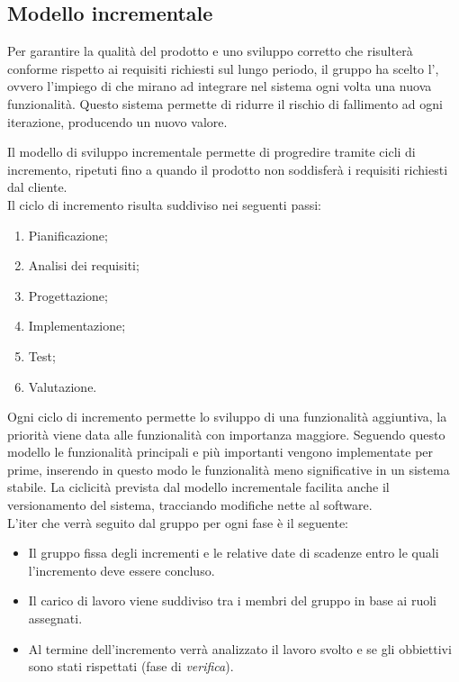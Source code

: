 \documentclass[../piano_di_progetto.tex]{subfiles}
\begin{document}
\subsection{Modello incrementale}
\label{sub:incr}

Per garantire la qualità del prodotto e uno sviluppo corretto che risulterà conforme rispetto ai requisiti richiesti sul lungo periodo, il gruppo ha scelto l’, ovvero l’impiego di  che mirano ad integrare nel sistema ogni volta una nuova funzionalità. Questo sistema permette di ridurre il rischio di fallimento ad ogni iterazione, producendo un nuovo valore.

Il modello di sviluppo incrementale permette di progredire tramite cicli di incremento, 
ripetuti fino a quando il prodotto non soddisferà i requisiti richiesti dal cliente. \\
Il ciclo di incremento risulta suddiviso nei seguenti passi:
\begin{enumerate}
    \item Pianificazione;
    \item Analisi dei requisiti;
    \item Progettazione;
    \item Implementazione;
    \item Test;
    \item Valutazione.
\end{enumerate}
Ogni ciclo di incremento permette lo sviluppo di una funzionalità aggiuntiva,
la priorità viene data alle funzionalità con importanza maggiore. Seguendo questo modello le funzionalità principali e più importanti vengono implementate per prime, inserendo in questo modo le funzionalità meno significative in un sistema stabile.
La ciclicità prevista dal modello incrementale facilita anche il versionamento del sistema,
tracciando modifiche nette al software.\\
L'iter che verrà seguito dal gruppo per ogni fase è il seguente:
\begin{itemize}
    \item Il gruppo fissa degli incrementi e le relative date di scadenze entro le quali l'incremento deve essere concluso.
    \item Il carico di lavoro viene suddiviso tra i membri del gruppo in base ai ruoli assegnati.
    \item Al termine dell'incremento verrà analizzato il lavoro svolto e se gli obbiettivi sono stati rispettati (fase di \emph{verifica}).
\end{itemize}
\end{document}
